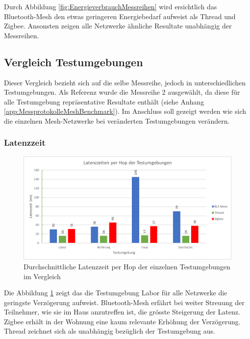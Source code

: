 Durch Abbildung \ref{fig:EnergieverbrauchMessreihen} wird ersichtlich das Bluetooth-Mesh den etwas geringeren Energiebedarf aufweist als Thread und Zigbee. Ansonsten zeigen alle Netzwerke ähnliche Resultate unabhängig der Messreihen. 


\subsection{Vergleich Testumgebungen}\label{subsec:VergleichTestumgebungen}

Dieser Vergleich bezieht sich auf die selbe Messreihe, jedoch in unterschiedlichen Testumgebungen. Als Referenz wurde die Messreihe 2 ausgewählt, da diese für alle Testumgebung repräsentative Resultate enthält (siehe Anhang \ref{app:MessprotokolleMeshBenchmark}). Im Anschluss soll gezeigt werden wie sich die einzelnen Mesh-Netzwerke bei veränderten Testumgebungen verändern.

\subsubsection{Latenzzeit}\label{subsec:VergleichLatenzzeitTestumgebungen}

\begin{figure}[h]
	\centering
	\includegraphics[width=1.0\textwidth]{graphics/Latenzzeiten_per_Hop_Testumgebungen.png}
	\caption{Durchschnittliche Latenzzeit per Hop der einzelnen Testumgebungen im Vergleich}\label{fig:Latenzzeiten_per_Hop_Testumgebungen}
\end{figure}

Die Abbildung \ref{fig:Latenzzeiten_per_Hop_Testumgebungen} zeigt das die Testumgebung Labor für alle Netzwerke die geringste Verzögerung aufweist. Bluetooth-Mesh erfährt bei weiter Streuung der Teilnehmer, wie sie im Haus anzutreffen ist, die grösste Steigerung der Latenz. Zigbee erhält in der Wohnung eine kaum relevante Erhöhung der Verzögerung. Thread zeichnet sich als unabhängig bezüglich der Testumgebung aus. 

